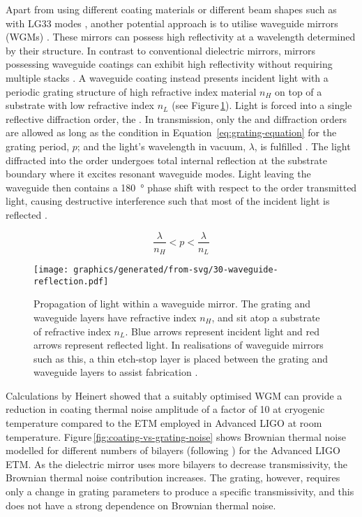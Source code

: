 Apart from using different coating materials \cite{Granata2013, Cole2013} or different beam shapes \cite{Mours2006, DAmbrosio2004, Bondarescu2006} such as with LG33 modes \cite{Sorazu2013}, another potential approach is to utilise waveguide mirrors (\gls{WGM}s) \cite{Brueckner2008, Brueckner2009, Brueckner2010, Friedrich2011}. These mirrors can possess high reflectivity at a wavelength determined by their structure. In contrast to conventional dielectric mirrors, mirrors possessing waveguide coatings can exhibit high reflectivity without requiring multiple stacks \cite{Bunkowski2006}. A waveguide coating instead presents incident light with a periodic grating structure of high refractive index material $n_H$ on top of a substrate with low refractive index $n_L$ (see Figure\,\ref{fig:waveguide-reflection}). Light is forced into a single reflective diffraction order, the . In transmission, only the  and  diffraction orders are allowed as long as the condition in Equation~\ref{eq:grating-equation} for the grating period, $p$; and the light's wavelength in vacuum, $\lambda$, is fulfilled \cite{Brueckner2008}. The light diffracted into the  order undergoes total internal reflection at the substrate boundary where it excites resonant waveguide modes. Light leaving the waveguide then contains a \SI{180}{\degree} phase shift with respect to the  order transmitted light, causing destructive interference such that most of the incident light is reflected \cite{Sharon1997}.

\begin{equation}
  \frac{\lambda}{n_{H}} < p < \frac{\lambda}{n_{L}}
  \label{eq:grating-equation}
\end{equation}

\begin{figure}
  \centering
  \texttt{[image: graphics/generated/from-svg/30-waveguide-reflection.pdf]}
  \caption{\label{fig:waveguide-reflection}Propagation of light within a waveguide mirror. The grating and waveguide layers have refractive index $n_H$, and sit atop a substrate of refractive index $n_L$. Blue arrows represent incident light and red arrows represent reflected light. In realisations of waveguide mirrors such as this, a thin etch-stop layer is placed between the grating and waveguide layers to assist fabrication \cite{Friedrich2011}.}
\end{figure}

Calculations by Heinert \etal{} \cite{Heinert2013} showed that a suitably optimised \gls{WGM} can provide a reduction in coating thermal noise amplitude of a factor of 10 at cryogenic temperature compared to the \gls{ETM} employed in Advanced LIGO at room temperature. Figure\,\ref{fig:coating-vs-grating-noise} shows Brownian thermal noise modelled for different numbers of bilayers (following \cite{Harry2002}) for the Advanced LIGO \gls{ETM}. As the dielectric mirror uses more bilayers to decrease transmissivity, the Brownian thermal noise contribution increases. The grating, however, requires only a change in grating parameters to produce a specific transmissivity, and this does not have a strong dependence on Brownian thermal noise.

